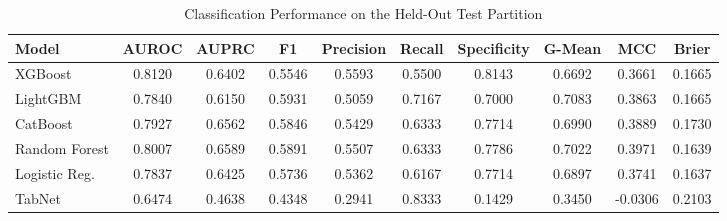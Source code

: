 \begin{table}
\centering
\caption{Classification Performance on the Held-Out Test Partition}
\label{tab:results}
\begin{tabular}{lccccccccc}
\toprule
Model & AUROC & AUPRC & F1 & Precision & Recall & Specificity & G-Mean & MCC & Brier \\
\midrule
XGBoost & 0.8120 & 0.6402 & 0.5546 & 0.5593 & 0.5500 & 0.8143 & 0.6692 & 0.3661 & 0.1665 \\
LightGBM & 0.7840 & 0.6150 & 0.5931 & 0.5059 & 0.7167 & 0.7000 & 0.7083 & 0.3863 & 0.1665 \\
CatBoost & 0.7927 & 0.6562 & 0.5846 & 0.5429 & 0.6333 & 0.7714 & 0.6990 & 0.3889 & 0.1730 \\
Random Forest & 0.8007 & 0.6589 & 0.5891 & 0.5507 & 0.6333 & 0.7786 & 0.7022 & 0.3971 & 0.1639 \\
Logistic Reg. & 0.7837 & 0.6425 & 0.5736 & 0.5362 & 0.6167 & 0.7714 & 0.6897 & 0.3741 & 0.1637 \\
TabNet & 0.6474 & 0.4638 & 0.4348 & 0.2941 & 0.8333 & 0.1429 & 0.3450 & -0.0306 & 0.2103 \\
\bottomrule
\end{tabular}
\end{table}
